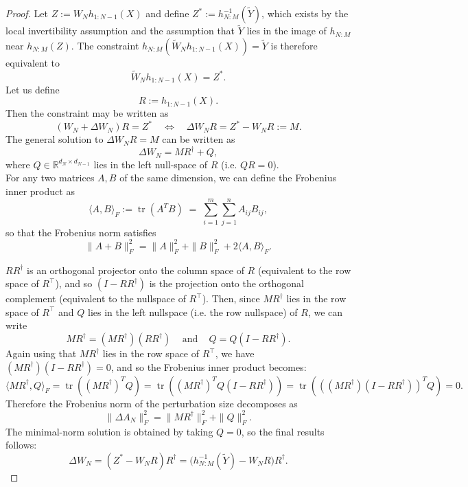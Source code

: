 \documentclass{article}
\theoremstyle{plain}
\theoremstyle{definition}
\theoremstyle{remark}
\begin{document}
\begin{proof}
Let \(Z := W_N h_{1:N-1}(X)\) and define \(Z^* := h_{N:M}^{-1}(\tilde Y)\), which exists by the local invertibility assumption and the assumption that \(\tilde Y\) lies in the image of \(h_{N:M}\) near \(h_{N:M}(Z)\). The constraint \(h_{N:M}( \tilde W_N h_{1:N-1}(X)) = \tilde Y\) is therefore equivalent to
\[
\tilde W_N h_{1:N-1}(X) = Z^*.
\]
Let us define 
\[
R :=h_{1:N-1}(X).
\]
Then the constraint may be written as 
\[
(W_N + \Delta W_N) R = Z^* \quad\Longleftrightarrow\quad \Delta W_N R = Z^* - W_N R := M.
\]
The general solution to \(\Delta W_N R = M\) can be written as
\[
\Delta W_N = M R^\dagger + Q,
\]
where \(Q \in \mathbb{R}^{d_N \times d_{N-1}}\) lies in the left null-space of $R$ (i.e. $QR =0$). \\

\noindent
For any two matrices $A, B$ of the same dimension, we can define the Frobenius inner product as \[\langle A, B \rangle_F := \operatorname{tr}\!\left(A^T B\right) \;=\; \sum_{i=1}^m \sum_{j=1}^n A_{ij}B_{ij},\]  so that the Frobenius norm satisfies
\[
\| A + B \|^2_F = \| A \|^2_F +  \| B \|^2_F + 2 \langle A, B \rangle_F.
\]

\noindent
 \(R R^\dagger\) is an orthogonal projector onto the column space of \(R\) (equivalent to the row space of $R^\top$), and so \((I - R R^\dagger)\) is the projection onto the orthogonal complement (equivalent to the nullspace of $R^\top$). Then, since $M R^\dagger$ lies in the row space of $R^\top$  and $Q$ lies in the left nullspace (i.e. the row nullspace) of $R$, we can write
 \[M R^\dagger = (M R^\dagger)(R R^\dagger) \; \; \; \textrm{ and } \; \; \;  Q = Q(I - R R^\dagger).\] 
Again using that \(M R^\dagger\) lies in the row space of $R^\top$, we have \((M R^\dagger)(I - R R^\dagger)=0\), and so the Frobenius inner product becomes:
\[
\langle M R^\dagger, Q \rangle_F 
= \operatorname{tr}\!\left((M R^\dagger)^T Q\right)
= \operatorname{tr}\!\left((M R^\dagger)^T Q(I - R R^\dagger)\right)
= \operatorname{tr}\!\left(((M R^\dagger)(I - R R^\dagger))^T Q\right)
= 0.
\]
 Therefore the Frobenius norm of the perturbation size decomposes as
\[
\|\Delta A_N\|_F^2 = \|M R^\dagger\|_F^2 + \|Q\|_F^2.
\]
The minimal-norm solution is obtained by taking \(Q=0\), so the final results follows:
\[
\Delta W_N = (Z^* - W_N R) R^\dagger = \bigl(h_{N:M}^{-1}(\tilde Y) - W_N R \bigr) R^\dagger.
\]
\end{proof}
\end{document}
